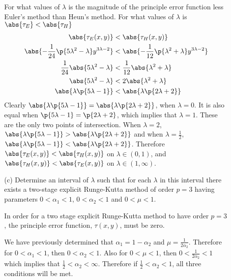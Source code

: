 \documentclass[11pt]{article}
\begin{document}
\begin{enumerate}
\begin{enumerate}
                For what values of $\lambda$ is the magnitude of the principle
                error function less Euler's method than Heun's method.
                For what values of $\lambda$ is $\abs{\tau_E} < \abs{\tau_H}$
                \begin{align*}
                    \abs{\tau_E(x,y)} &< \abs{\tau_H(x,y)} \\
                    \abs{-\frac{1}{24}\p{5\lambda^2 - \lambda} y^{3\lambda - 2}} &< \abs{-\frac{1}{12}\p{\lambda^2 + \lambda} y^{3\lambda - 2}} \\
                    \frac{1}{24}\abs{5\lambda^2 - \lambda} &< \frac{1}{12}\abs{\lambda^2 + \lambda} \\
                    \abs{5\lambda^2 - \lambda} &< 2\abs{\lambda^2 + \lambda} \\
                    \abs{\lambda\p{5\lambda - 1}} &< \abs{\lambda\p{2\lambda + 2}} \\
                \end{align*}
                Clearly $\abs{\lambda\p{5\lambda - 1}} = \abs{\lambda\p{2\lambda + 2}}$,
                when $\lambda = 0$.
                It is also equal when $\p{5\lambda - 1} = \p{2\lambda + 2}$,
                which implies that $\lambda = 1$.
                These are the only two points of intersection.
                When $\lambda = 2$, $\abs{\lambda\p{5\lambda - 1}} > \abs{\lambda\p{2\lambda + 2}}$
                and when $\lambda = \frac{1}{2}$, $\abs{\lambda\p{5\lambda - 1}} < \abs{\lambda\p{2\lambda + 2}}$.
                Therefore $\abs{\tau_E(x,y)} < \abs{\tau_H(x,y)}$ on $\lambda \in (0, 1)$, and
                $\abs{\tau_H(x,y)} < \abs{\tau_E(x,y)}$ on $\lambda \in (1, \infty)$.

            \item[(c)]
                Determine an interval of $\lambda$ such that for each
                $\lambda$ in this interval there exists a two-stage explicit
                Runge-Kutta method of order $p = 3$ having parameters
                $0 < \alpha_1 < 1$, $0 < \alpha_2 < 1$ and $0 < \mu < 1$.

                In order for a two stage explicit Runge-Kutta method to have
                order $p = 3$, the principle error function, $\tau(x,y)$, must
                be zero.

                We have previously determined that $\alpha_1 = 1 - \alpha_2$
                and $\mu = \frac{1}{2\alpha_2}$.
                Therefore for $0 < \alpha_1 < 1$, then $0 < \alpha_2 < 1$.
                Also for $0 < \mu < 1$, then $0 < \frac{1}{2\alpha_2} < 1$
                which implies that $\frac{1}{2} < \alpha_2 < \infty$.
                Therefore if $\frac{1}{2} < \alpha_2 < 1$, all three conditions
                will be met.


\end{enumerate}
\end{enumerate}
\end{document}
